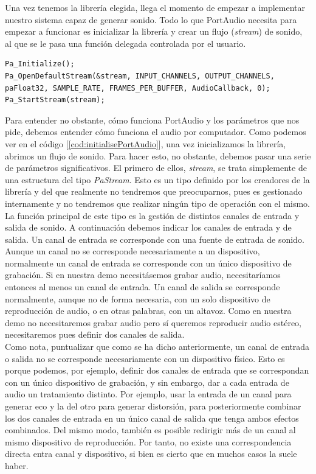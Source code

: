 Una vez tenemos la librería elegida, llega el momento de empezar a implementar nuestro sistema capaz de generar sonido. Todo lo que PortAudio necesita para empezar a funcionar es inicializar la librería y crear un flujo (\emph{stream}) de sonido, al que se le pasa una función delegada controlada por el usuario.\\

\begin{lstlisting}[style=C-color, caption={Código necesario para inicializar PortAudio},label=cod:initialisePortAudio]
Pa_Initialize();
Pa_OpenDefaultStream(&stream, INPUT_CHANNELS, OUTPUT_CHANNELS, paFloat32, SAMPLE_RATE, FRAMES_PER_BUFFER, AudioCallback, 0);
Pa_StartStream(stream);
\end{lstlisting}

Para entender no obstante, cómo funciona PortAudio y los parámetros que nos pide, debemos entender cómo funciona el audio por computador. Como podemos ver en el código [\ref{cod:initialisePortAudio}], una vez inicializamos la librería, abrimos un flujo de sonido. Para hacer esto, no obstante, debemos pasar una serie de parámetros significativos. El primero de ellos, \emph{stream}, se trata simplemente de una estructura del tipo \emph{PaStream}. Esto es un tipo definido por los creadores de la librería y del que realmente no tendremos que preocuparnos, pues es gestionado internamente y no tendremos que realizar ningún tipo de operación con el mismo. La función principal de este tipo es la gestión de distintos canales de entrada y salida de sonido. A continuación debemos indicar los canales de entrada y de salida. Un canal de entrada se corresponde con una fuente de entrada de sonido. Aunque un canal no se corresponde necesariamente a un dispositivo, normalmente un canal de entrada se corresponde con un único dispositivo de grabación. Si en nuestra demo necesitásemos grabar audio, necesitaríamos entonces al menos un canal de entrada. Un canal de salida se corresponde normalmente, aunque no de forma necesaria, con un solo dispositivo de reproducción de audio, o en otras palabras, con un altavoz. Como en nuestra demo no necesitaremos grabar audio pero sí queremos reproducir audio estéreo, necesitaremos pues definir dos canales de salida.\\

Como nota, puntualizar que como se ha dicho anteriormente, un canal de entrada o salida no se corresponde necesariamente con un dispositivo físico. Esto es porque podemos, por ejemplo, definir dos canales de entrada que se correspondan con un único dispositivo de grabación, y sin embargo, dar a cada entrada de audio un tratamiento distinto. Por ejemplo, usar la entrada de un canal para generar eco y la del otro para generar distorsión, para posteriormente combinar los dos canales de entrada en un único canal de salida que tenga ambos efectos combinados. Del mismo modo, también es posible redirigir más de un canal al mismo dispositivo de reproducción. Por tanto, no existe una correspondencia directa entra canal y dispositivo, si bien es cierto que en muchos casos la suele haber.\\

